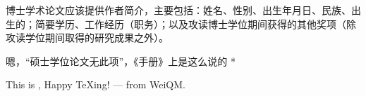 \biography
博士学术论文应该提供作者简介，主要包括：姓名、性别、出生年月日、民族、出生的；简要学历、工作经历（职务）；以及攻读博士学位期间获得的其他奖项（除攻读学位期间取得的研究成果之外）。

\par * 嗯，“硕士学位论文无此项”，《手册》上是这么说的 * \par

\vspace{5cm}

This is \BUAAThesis{}, Happy TeXing! --- from WeiQM.